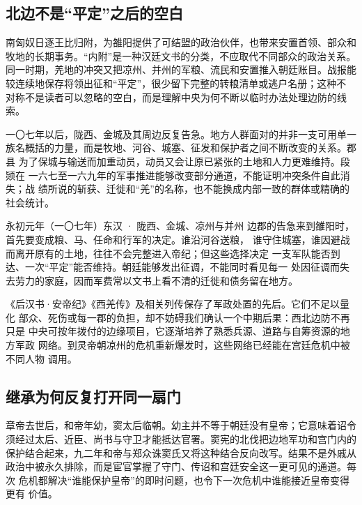 \subsection{北边不是“平定”之后的空白}

南匈奴日逐王比归附，为雒阳提供了可结盟的政治伙伴，也带来安置首领、部众和
牧地的长期事务。“内附”是一种汉廷文书的分类，不应取代不同部众的政治关系。
同一时期，羌地的冲突又把凉州、并州的军粮、流民和安置推入朝廷账目。战报能
较连续地保存将领出征和“平定”，很少留下完整的转粮清单或逃户名册；这种不
对称不是读者可以忽略的空白，而是理解中央为何不断以临时办法处理边防的线索。

一〇七年以后，陇西、金城及其周边反复告急。地方人群面对的并非一支可用单一
族名概括的力量，而是牧地、河谷、城塞、征发和保护者之间不断改变的关系。郡县
为了保城与输送而加重动员，动员又会让原已紧张的土地和人力更难维持。段颎在
一六七至一六九年的军事推进能够改变部分通道，不能证明冲突条件自此消失；战
绩所说的斩获、迁徙和“羌”的名称，也不能换成内部一致的群体或精确的社会统计。

\begin{event}{}{永初元年（一〇七年）}{东汉 · 陇西、金城、凉州与并州}{}
边郡的告急来到雒阳时，首先要变成粮、马、任命和行军的决定。谁沿河谷送粮，
谁守住城塞，谁因避战而离开原有的土地，往往不会完整进入帝纪；但这些选择决定
一支军队能否到达、一次“平定”能否维持。朝廷能够发出征调，不能同时看见每一
处因征调而失去劳力的家庭，因而军费常以文书上看不清的迁徙和债务留在地方。

《后汉书·安帝纪》《西羌传》及相关列传保存了军政处置的先后。它们不足以量化
部众、死伤或每一郡的负担，却不妨碍我们确认一个中期后果：西北边防不再只是
中央可按年拨付的边缘项目，它逐渐培养了熟悉兵源、道路与自筹资源的地方军政
网络。到灵帝朝凉州的危机重新爆发时，这些网络已经能在宫廷危机中被不同人物
调用。
\end{event}

\subsection{继承为何反复打开同一扇门}

章帝去世后，和帝年幼，窦太后临朝。幼主并不等于朝廷没有皇帝；它意味着诏令
须经过太后、近臣、尚书与守卫才能抵达官署。窦宪的北伐把边地军功和宫门内的
保护结合起来，九二年和帝与郑众诛窦氏又将这种结合反向改写。结果不是外戚从
政治中被永久排除，而是宦官掌握了守门、传诏和宫廷安全这一更可见的通道。每次
危机都解决“谁能保护皇帝”的即时问题，也令下一次危机中谁能接近皇帝变得更有
价值。

